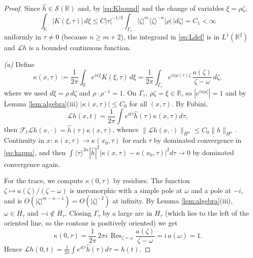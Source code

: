\documentclass[10pt,reqno]{amsart}
\theoremstyle{remark}
\numberwithin{equation}{section}
\newcommand{\R}{\mathbb R}
\newcommand{\om}{\omega}
\newcommand{\Res}{\operatorname{Res}}
\newcommand{\lan}{\langle}
\newcommand{\ran}{\rangle}
\newcommand{\Lc}{\mathcal{L}}
\begin{document}
\begin{proof}
Since $\widehat h\in\mathcal S(\R)$ and, by \eqref{eq:Kbound} and the change of variables $\xi=\rho\zeta$,
\begin{equation}\label{eq:L1}
\int_\R|K(\xi,\tau)|\,d\xi\le C|\tau|^{-1/3}\int_{\Gamma_\tau}|\zeta|^m\lan\zeta\ran^{-n}|\rho|\,|d\zeta|=C_1<\infty
\end{equation}
uniformly in $\tau\ne0$ (because $n\ge m+2$), the integrand in \eqref{eq:Ldef} is in $L^1(\R^2)$ and $\Lc h$ is a bounded continuous function.

\emph{(a)} Define
\begin{equation}\label{eq:kappa}
\kappa(x,\tau):=\frac1{2\pi}\int_\R e^{ix\xi}K(\xi,\tau)\,d\xi=\frac1{2\pi}\int_{\Gamma_\tau}e^{ix\rho(\tau)\zeta}\,\frac{a(\zeta)}{\zeta-\om}\,d\zeta ,
\end{equation}
where we used $d\xi=\rho\,d\zeta$ and $\rho\cdot\rho^{-1}=1$. On $\Gamma_\tau$, $\rho\zeta=\xi\in\R$, so $|e^{ix\rho\zeta}|=1$ and by Lemma \ref{lem:algebra}(iii) $|\kappa(x,\tau)|\le C_0$ for all $(x,\tau)$. By Fubini, $$\Lc h(x,t)=\frac1{2\pi}\int e^{it\tau}\widehat h(\tau)\kappa(x,\tau)d\tau,$$ then  $\mathcal F_t\Lc h(x,\cdot)=\widehat h(\tau)\kappa(x,\tau)$, whence $\|\Lc h(x,\cdot)\|_{H^\alpha}\le C_0\|h\|_{H^\alpha}$. Continuity in $x$: $\kappa(x,\tau)\to\kappa(x_0,\tau)$ for each $\tau$ by dominated convergence in \eqref{eq:kappa}, and then $\int\lan\tau\ran^{2\alpha}|\widehat h|^2|\kappa(x,\tau)-\kappa(x_0,\tau)|^2d\tau\to0$ by dominated convergence again.

For the trace, we compute $\kappa(0,\tau)$ by residues. The function $\zeta\mapsto a(\zeta)/(\zeta-\om)$ is meromorphic with a simple pole at $\om$ and a pole at $-i$, and is $O(|\zeta|^{m-n-1})=O(|\zeta|^{-2})$ at infinity. By Lemma \ref{lem:algebra}(iii), $\om\in H_\tau$ and $-i\notin\overline{H_\tau}$. Closing $\Gamma_\tau$ by a large arc in $H_\tau$ (which lies to the left of the oriented line, so the contour is positively oriented) we get
$$\kappa(0,\tau)=\frac1{2\pi}\,2\pi i\,\Res_{\zeta=\om}\frac{a(\zeta)}{\zeta-\om}=i\,a(\om)=1 .$$
Hence $\Lc h(0,t)=\frac1{2\pi}\int e^{it\tau}\widehat h(\tau)d\tau=h(t)$.


\end{proof}
\end{document}
